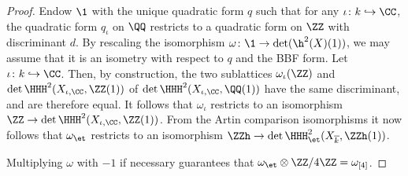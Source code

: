 \begin{proof}
Endow $\1$ with the unique quadratic form $q$ such that for any $\iota\colon k \hookrightarrow \CC$, the quadratic form $q_{\iota}$ on $\QQ$ restricts to a quadratic form on $\ZZ$ with discriminant $d$. By rescaling the isomorphism $\omega\colon \1 \rightarrow \det(\h^2(X)(1))$, we may assume that it is an isometry with respect to $q$ and the BBF form. Let $\iota\colon k \hookrightarrow \CC$. Then, by construction, the two sublattices $\omega_{\iota}(\ZZ)$ and $\det \HHH^2(X_{\iota,\CC},\ZZ(1))$ of $\det \HHH^2(X_{\iota,\CC},\QQ(1))$ have the same discriminant, and are therefore equal. It follows that $\omega_{\iota}$ restricts to an isomorphism $\ZZ \rightarrow \det\HHH^2(X_{\iota,\CC},\ZZ(1))$. From the Artin comparison isomorphisms it now follows that $\omega_{\et}$ restricts to an isomorphism $\ZZh \rightarrow \det \HHH^2_{\et}(X_{\overline{k}},\ZZh(1))$.

Multiplying $\omega$ with $-1$ if necessary guarantees that $\omega_{\et} \otimes \ZZ/4\ZZ = \omega_{[4]}$.
\end{proof}

